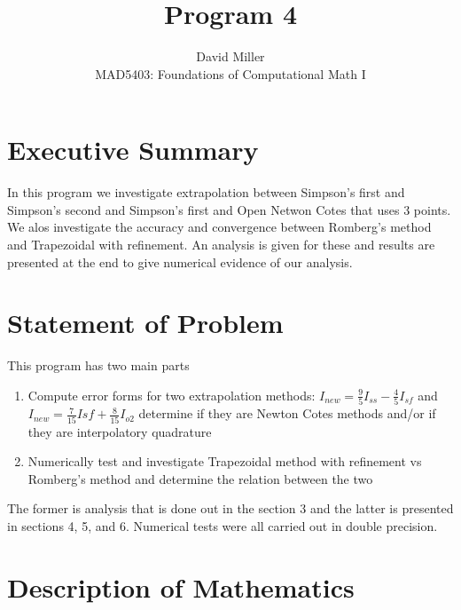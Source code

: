 \documentclass[12pt]{article}
\theoremstyle{remark}
\begin{document}
 
\title{Program 4}
\author{David Miller \\ 
MAD5403: Foundations of Computational Math I} 
 
\maketitle

\section{Executive Summary}

In this program we investigate extrapolation between Simpson's first and Simpson's second and Simpson's first and Open Netwon Cotes that uses 3 points. We alos investigate the accuracy and convergence between Romberg's method and Trapezoidal with refinement. An analysis is given for these and results are presented at the end to give numerical evidence of our analysis. 

\section{Statement of Problem}

This program has two main parts
\begin{enumerate}
	\item Compute error forms for two extrapolation methods: $I_{new} = \frac{9}{5}I_{ss} - \frac{4}{5}I_{sf}$ and $I_{new} = \frac{7}{15}I{sf} + \frac{8}{15}I_{o2}$ determine if they are Newton Cotes methods and/or if they are interpolatory quadrature
	\item Numerically test and investigate Trapezoidal method with refinement vs Romberg's method and determine the relation between the two
\end{enumerate}
The former is analysis that is done out in the section 3 and the latter is presented in sections 4, 5, and 6.  Numerical tests were all carried out in double precision.	

\newpage 

\section{Description of Mathematics}
\end{document}

